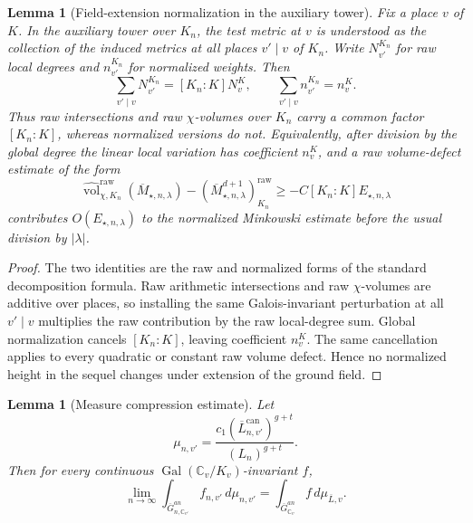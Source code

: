 \documentclass[10pt,a4paper]{amsart}
\theoremstyle{plain}
\newtheorem{lemma}[theorem]{Lemma}
\DeclareMathOperator{\Gal}{Gal}
\theoremstyle{plain}
\numberwithin{equation}{section}
\providecommand{\ol}{\overline}
\providecommand{\can}{\operatorname{can}}
\begin{document}
\begin{lemma}[Field-extension normalization in the auxiliary tower]
	\label{lem:field-extension-normalization}
	Fix a place \(v\) of \(K\).  In the auxiliary tower over \(K_n\), the test
	metric at \(v\) is understood as the collection of the induced metrics at all
	places \(v'\mid v\) of \(K_n\).  Write \(N_{v'}^{K_n}\) for raw local degrees
	and \(n_{v'}^{K_n}\) for normalized weights.  Then
	\[
	\sum_{v'\mid v}N_{v'}^{K_n}=[K_n:K]N_v^K,
	\qquad
	\sum_{v'\mid v}n_{v'}^{K_n}=n_v^K.
	\]
	Thus raw intersections and raw \(\chi\)-volumes over \(K_n\) carry a common
	factor \([K_n:K]\), whereas normalized versions do not.  Equivalently, after
	division by the global degree the linear local variation has coefficient
	\(n_v^K\), and a raw volume-defect estimate of the form
	\[
	\widehat{\operatorname{vol}}_{\chi,K_n}^{\mathrm{raw}}(\overline M_{\star,n,\lambda})
	-(\overline M_{\star,n,\lambda}^{d+1})^{\mathrm{raw}}_{K_n}
	\ge -C [K_n:K]E_{\star,n,\lambda}
	\]
	contributes \(O(E_{\star,n,\lambda})\) to the normalized Minkowski estimate
	before the usual division by \(|\lambda|\).
\end{lemma}

\begin{proof}
	The two identities are the raw and normalized forms of the standard
	decomposition formula.  Raw arithmetic intersections and raw
	\(\chi\)-volumes are additive over places, so installing the
	same Galois-invariant perturbation at all \(v'\mid v\) multiplies the
	raw contribution by the raw local-degree sum.  Global normalization cancels
	\([K_n:K]\), leaving coefficient \(n_v^K\).  The same cancellation applies to
	every quadratic or constant raw volume defect.  Hence no normalized height in
	the sequel changes under extension of the ground field.
\end{proof}

\begin{lemma}[Measure compression estimate]
	\label{lem:canonical-measure}
	Let
	\[
	\mu_{n,v'}=
	\frac{c_1(\ol L_{n,v'}^{\can})^{g+t}}{(L_n)^{g+t}}.
	\]
	Then for every continuous \(\Gal(\mathbb{C}_v/K_v)\)-invariant \(f\),
	\[
	\lim_{n\to\infty}
	\int_{\ol G_{n,\mathbb{C}_{v'}}^{an}} f_{n,v'}\,d\mu_{n,v'}
	=
	\int_{\ol G_{\mathbb{C}_v}^{an}}f\,d\mu_{\ol L,v}.
	\]
\end{lemma}
\end{document}
